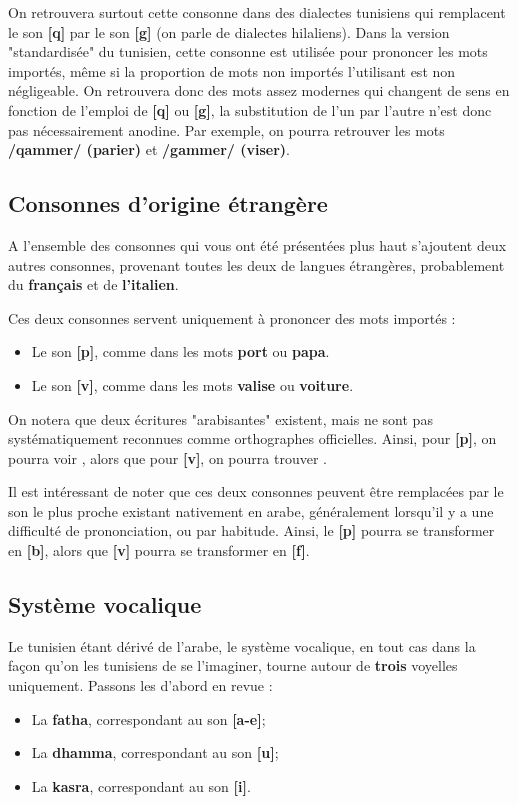 On retrouvera surtout cette consonne dans des dialectes tunisiens qui remplacent le son \textbf{[q]} par le son \textbf{[g]} (on parle de dialectes hilaliens). Dans la version "standardisée" du tunisien, cette consonne est utilisée pour prononcer les mots importés, même si la proportion de mots non importés l'utilisant est non négligeable. On retrouvera donc des mots assez modernes qui changent de sens en fonction de l'emploi de \textbf{[q]} ou \textbf{[g]}, la substitution de l'un par l'autre n'est donc pas nécessairement anodine. Par exemple, on pourra retrouver les mots \textbf{/qammer/ (parier)} et \textbf{/gammer/ (viser)}.

\subsection{Consonnes d'origine étrangère}

A l'ensemble des consonnes qui vous ont été présentées plus haut s'ajoutent deux autres consonnes, provenant toutes les deux de langues étrangères, probablement du \textbf{français} et de \textbf{l'italien}.

Ces deux consonnes servent uniquement à prononcer des mots importés : 
\begin{itemize}
    \item Le son \textbf{[p]}, comme dans les mots \textbf{port} ou \textbf{papa}.
    \item Le son \textbf{[v]}, comme dans les mots \textbf{valise} ou \textbf{voiture}.
\end{itemize}

On notera que deux écritures "arabisantes" existent, mais ne sont pas systématiquement reconnues comme orthographes officielles. Ainsi, pour \textbf{[p]}, on pourra voir , alors que pour \textbf{[v]}, on pourra trouver .

Il est intéressant de noter que ces deux consonnes peuvent être remplacées par le son le plus proche existant nativement en arabe, généralement lorsqu'il y a une difficulté de prononciation, ou par habitude. Ainsi, le \textbf{[p]} pourra se transformer en \textbf{[b]}, alors que \textbf{[v]} pourra se transformer en \textbf{[f]}.

\subsection{Système vocalique}
Le tunisien étant dérivé de l'arabe, le système vocalique, en tout cas dans la façon qu'on les tunisiens de se l'imaginer, tourne autour de \textbf{trois} voyelles uniquement. Passons les d'abord en revue :
\begin{itemize}
    \item La \textbf{fatha}, correspondant au son \textbf{[a-e]};
    \item La \textbf{dhamma}, correspondant au son \textbf{[u]};
    \item La \textbf{kasra}, correspondant au son \textbf{[i]}.
\end{itemize}

